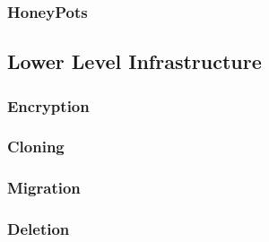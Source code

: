 \subsubsection{HoneyPots}
\label{hlHoneyPots}

\subsection{Lower Level Infrastructure}
\label{llInfrastructure}

\subsubsection{Encryption}
\label{llEncryption}

\subsubsection{Cloning}
\label{llCloning}

\subsubsection{Migration}
\label{llMigration}

\subsubsection{Deletion}
\label{llDeletion}
